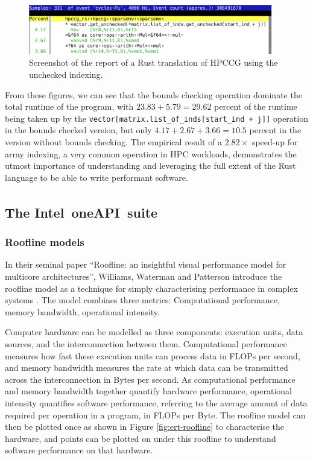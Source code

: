 \begin{figure}[H]
    \centering
    \includegraphics[width=0.95\textwidth]{images/5_performance/perf/perf_unchecked_op.png}
    \caption{Screenshot of the  report of a Rust translation of HPCCG using the unchecked indexing.}
    \label{fig:perf-unchecked}
\end{figure}

From these figures, we can see that the bounds checking operation dominate the total runtime of the program, with $23.83 + 5.79 = 29.62$ percent of the runtime being taken up by the \texttt{vector[matrix.list_of_inds[start_ind + j]]} operation in the bounds checked version, but only $4.17 + 2.67 + 3.66 = 10.5$ percent in the version without bounds checking. The empirical result of a $2.82\times$ speed-up for array indexing, a very common operation in \acrshort{HPC} workloads, demonstrates the utmost importance of understanding and leveraging the full extent of the Rust language to be able to write performant software.

\subsection{The Intel\textsuperscript{\textregistered}\ oneAPI\texttrademark\ suite}
\label{ssec:intel-advisor-profiler}

\subsubsection{Roofline models}
\label{sssec:roofline-models}

In their seminal paper ``Roofline: an insightful visual performance model for multicore architectures'', Williams, Waterman and Patterson introduce the roofline model as a technique for simply characterising performance in complex systems \cite{williamsRooflineInsightfulVisual2009}. The model combines three metrics: Computational performance, memory bandwidth, operational intensity.

Computer hardware can be modelled as three components: execution units, data sources, and the interconnection between them. Computational performance measures how fast these execution units can process data in \acrfull{FLOPs} per second, and memory bandwidth measures the rate at which data can be transmitted across the interconnection in Bytes per second. As computational performance and memory bandwidth together quantify hardware performance, operational intensity quantifies software performance, referring to the average amount of data required per operation in a program, in \acrshort{FLOPs} per Byte. The roofline model can then be plotted once as shown in Figure \ref{fig:ert-roofline} to characterise the hardware, and points can be plotted on under this roofline to understand software performance on that hardware.

